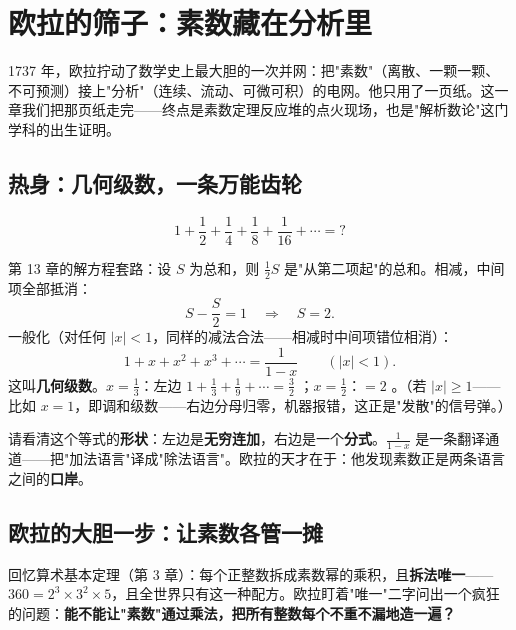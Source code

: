 \chapter{欧拉的筛子：素数藏在分析里}

1737 年，欧拉拧动了数学史上最大胆的一次并网：把"素数"（离散、一颗一颗、不可预测）接上"分析"（连续、流动、可微可积）的电网。他只用了一页纸。这一章我们把那页纸走完——终点是素数定理反应堆的点火现场，也是"解析数论"这门学科的出生证明。

\section{热身：几何级数，一条万能齿轮}

\begin{kaiwei}
\[
1 + \frac12 + \frac14 + \frac18 + \frac1{16} + \cdots = ?
\]
\end{kaiwei}

第 13 章的解方程套路：设 $S$ 为总和，则 $\tfrac12 S$ 是"从第二项起"的总和。相减，中间项全部抵消：
\[
S - \frac S2 = 1 \quad\Longrightarrow\quad S = 2 .
\]
一般化（对任何 $|x| < 1$，同样的减法合法——相减时中间项错位相消）：
\[
\boxed{\;1 + x + x^2 + x^3 + \cdots = \frac{1}{1-x}\qquad (|x|<1).\;}
\]
这叫\textbf{几何级数}。$x = \tfrac13$：左边 $1 + \tfrac13 + \tfrac19+\cdots = \tfrac32$ \checkmark；$x = \tfrac12$：$= 2$ \checkmark。（若 $|x| \ge 1$——比如 $x = 1$，即调和级数——右边分母归零，机器报错，这正是"发散"的信号弹。）

请看清这个等式的\textbf{形状}：左边是\textbf{无穷连加}，右边是一个\textbf{分式}。$\tfrac1{1-x}$ 是一条翻译通道——把"加法语言"译成"除法语言"。欧拉的天才在于：他发现素数正是两条语言之间的\textbf{口岸}。

\section{欧拉的大胆一步：让素数各管一摊}

回忆算术基本定理（第 3 章）：每个正整数拆成素数幂的乘积，且\textbf{拆法唯一}——$360 = 2^3\times3^2\times5$，且全世界只有这一种配方。欧拉盯着"唯一"二字问出一个疯狂的问题：\textbf{能不能让"素数"通过乘法，把所有整数每个不重不漏地造一遍？}

